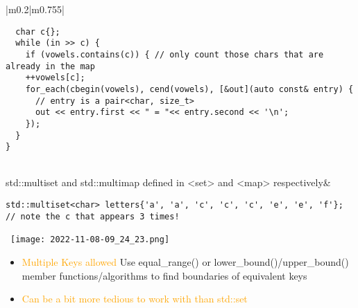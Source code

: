 \documentclass[main.tex,fontsize=8pt,paper=a4,paper=portrait,DIV=calc]{scrartcl}
\begin{document}
\begin{table}[ht!]
\begin{tabular}{|m{0.2\linewidth}|m{0.755\linewidth}|}
\begin{lstlisting}
  char c{};
  while (in >> c) {
    if (vowels.contains(c)) { // only count those chars that are already in the map
    ++vowels[c];
    for_each(cbegin(vowels), cend(vowels), [&out](auto const& entry) {
      // entry is a pair<char, size_t>
      out << entry.first << " = "<< entry.second << '\n';
    });
  }
}
\end{lstlisting}\\
\hline
std::multiset and std::multimap \newline
defined in <set> and <map> respectively& 
\begin{lstlisting}
std::multiset<char> letters{'a', 'a', 'c', 'c', 'c', 'e', 'e', 'f'};
// note the c that appears 3 times!
\end{lstlisting}
\, \newline
\texttt{[image: 2022-11-08-09\_24\_23.png]}\newline
\begin{itemize}
\item \textcolor{orange}{Multiple Keys allowed}\newline
  Use equal\_range() or lower\_bound()/upper\_bound() member functions/algorithms to find boundaries of equivalent keys
\item \textcolor{orange}{Can be a bit more tedious to work with than std::set}
\vspace{-2mm}
\end{itemize} \\
\hline
\end{tabular}
\end{table}
\pagebreak
\end{document}

